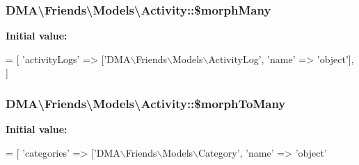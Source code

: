 \subsubsection[{\$morph\+Many}]{\setlength{\rightskip}{0pt plus 5cm}D\+M\+A\textbackslash{}\+Friends\textbackslash{}\+Models\textbackslash{}\+Activity\+::\$morph\+Many}\label{classDMA_1_1Friends_1_1Models_1_1Activity_a192fdaacf609961b7a436d2b967dfd60}
{\bfseries Initial value\+:}
\begin{DoxyCode}
= [ 
        \textcolor{stringliteral}{'activityLogs'}  => [\textcolor{stringliteral}{'DMA\(\backslash\)Friends\(\backslash\)Models\(\backslash\)ActivityLog'}, \textcolor{stringliteral}{'name'} => \textcolor{stringliteral}{'object'}],
    ]
\end{DoxyCode}
\hypertarget{classDMA_1_1Friends_1_1Models_1_1Activity_a5cfb1d646716be755dcdb6ddb3ab16b1}{}
\subsubsection[{\$morph\+To\+Many}]{\setlength{\rightskip}{0pt plus 5cm}D\+M\+A\textbackslash{}\+Friends\textbackslash{}\+Models\textbackslash{}\+Activity\+::\$morph\+To\+Many}\label{classDMA_1_1Friends_1_1Models_1_1Activity_a5cfb1d646716be755dcdb6ddb3ab16b1}
{\bfseries Initial value\+:}
\begin{DoxyCode}
= [
        \textcolor{stringliteral}{'categories'}    => [\textcolor{stringliteral}{'DMA\(\backslash\)Friends\(\backslash\)Models\(\backslash\)Category'}, \textcolor{stringliteral}{'name'} => \textcolor{stringliteral}{'object'}
\end{DoxyCode}
\hypertarget{classDMA_1_1Friends_1_1Models_1_1Activity_a0b92e75aa8d92e2d3c9b24f54cd813bc}{}
